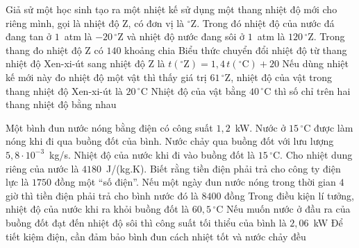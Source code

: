 	\begin{ex}%
		Giả sử một học sinh tạo ra một nhiệt kế sử dụng một thang nhiệt độ mới cho riêng mình, gọi là nhiệt độ Z, có đơn vị là $^\circ$Z. Trong đó nhiệt độ của nước đá đang tan ở $1$~atm là $-20\,^\circ\text{Z}$ và nhiệt độ nước đang sôi ở $1$~atm là $120\,^\circ\text{Z}$.
		\choiceTFt
		{\True Trong thang đo nhiệt độ Z có $140$ khoảng chia}
		{Biểu thức chuyển đổi nhiệt độ từ thang nhiệt độ Xen-xi-út sang nhiệt độ Z là $t(^\circ\text{Z})=1{,}4\,t(^\circ\text{C})+20$}
		{Nếu dùng nhiệt kế mới này đo nhiệt độ một vật thì thấy giá trị $61\,^\circ\text{Z}$, nhiệt độ của vật trong thang nhiệt độ Xen-xi-út là $20\,^\circ\text{C}$}
		{Nhiệt độ của vật bằng $40\,^\circ\text{C}$ thì số chỉ trên hai thang nhiệt độ bằng nhau}
	\end{ex}

	\begin{ex}%
		Một bình đun nước nóng bằng điện có công suất $1{,}2$~kW. Nước ở $15\,^\circ\text{C}$ được làm nóng khi đi qua buồng đốt của bình. Nước chảy qua buồng đốt với lưu lượng $5{,}8\cdot 10^{-3}$~kg/s. Nhiệt độ của nước khi đi vào buồng đốt là $15\,^\circ\text{C}$. Cho nhiệt dung riêng của nước là $4180$~J/(kg.K). Biết rằng tiền điện phải trả cho công ty điện lực là $1750$ đồng một ``số điện''.
		\choiceTFt
		{\True Nếu một ngày đun nước nóng trong thời gian $4$ giờ thì tiền điện phải trả cho bình nước đó là $8400$ đồng}
		{Trong điều kiện lí tưởng, nhiệt độ của nước khi ra khỏi buồng đốt là $60{,}5\,^\circ\text{C}$}
		{\True Nếu muốn nước ở đầu ra của buồng đốt đạt đến nhiệt độ sôi thì công suất tối thiểu của bình là $2{,}06$~kW}
		{\True Để tiết kiệm điện, cần đảm bảo bình đun cách nhiệt tốt và nước chảy đều}
	\end{ex}

